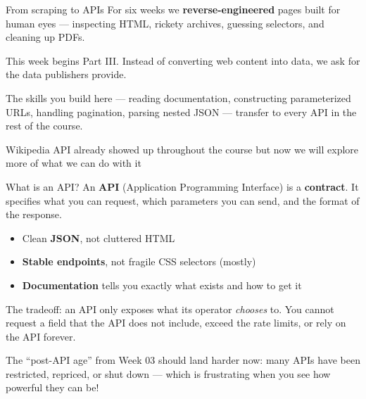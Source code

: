 \documentclass[9pt,aspectratio=169]{beamer}
\begin{document}
\begin{frame}{From scraping to APIs}
    For six weeks we \textbf{reverse-engineered} pages built for human eyes --- inspecting HTML, rickety archives, guessing selectors, and cleaning up PDFs.

    \bigskip

    This week begins Part III. Instead of converting web content into data, we ask for the data publishers provide.

    \bigskip

    The skills you build here --- reading documentation, constructing parameterized URLs, handling pagination, parsing nested JSON --- transfer to every API in the rest of the course.

    \bigskip

    Wikipedia API already showed up throughout the course but now we will explore more of what we can do with it
\end{frame}

\begin{frame}{What is an API?}
    An \textbf{API} (Application Programming Interface) is a \textbf{contract}. It specifies what you can request, which parameters you can send, and the format of the response.

    \bigskip

    \begin{itemize}
        \item Clean \textbf{JSON}, not cluttered HTML
        \item \textbf{Stable endpoints}, not fragile CSS selectors (mostly)
        \item \textbf{Documentation} tells you exactly what exists and how to get it
    \end{itemize}

    \bigskip

    The tradeoff: an API only exposes what its operator \textit{chooses} to. You cannot request a field that the API does not include, exceed the rate limits, or rely on the API forever. 

    \bigskip
    
    The ``post-API age'' from Week 03 should land harder now: many APIs have been restricted, repriced, or shut down --- which is frustrating when you see how powerful they can be!
\end{frame}
\end{document}
